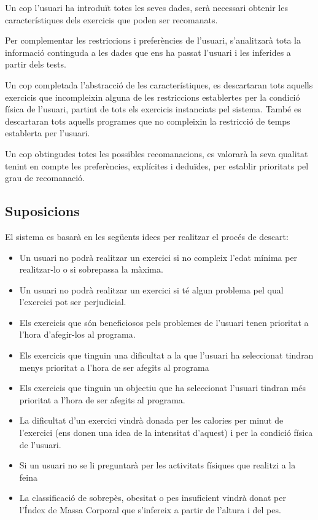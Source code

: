 \documentclass[a4paper, 12pt, UTF8]{article}
\begin{document}
Un cop l'usuari ha introduït totes les seves dades, serà necessari obtenir les característiques dels exercicis que poden ser recomanats. 

Per complementar les restriccions i preferències de l'usuari, s'analitzarà tota la informació continguda a les dades que ens ha passat l'usuari i les inferides a partir dels tests.

Un cop completada l'abstracció de les característiques, es descartaran tots aquells exercicis que incompleixin alguna de les restriccions establertes per la condició física de l'usuari, partint de tots els exercicis instanciats pel sistema. També es descartaran tots aquells programes que no compleixin la restricció de temps establerta per l'usuari.

Un cop obtingudes totes les possibles recomanacions, es valorarà la seva qualitat tenint en compte les preferències, explícites i deduïdes, per establir prioritats pel grau de recomanació.

\subsection{Suposicions}

El sistema es basarà en les següents idees per realitzar el procés de descart:

\begin{itemize}
	\item Un usuari no podrà realitzar un exercici si no compleix l'edat mínima per realitzar-lo o si sobrepassa la màxima.
	\item Un usuari no podrà realitzar un exercici si té algun problema pel qual l'exercici pot ser perjudicial.
	\item Els exercicis que són beneficiosos pels problemes de l'usuari tenen prioritat a l'hora d'afegir-los al programa.
	\item Els exercicis que tinguin una dificultat a la que l'usuari ha seleccionat tindran menys prioritat a l'hora de ser afegits al programa
	\item Els exercicis que tinguin un objectiu que ha seleccionat l'usuari tindran més prioritat a l'hora de ser afegits al programa.
	\item La dificultat d'un exercici vindrà donada per les calories per minut de l'exercici (ens donen una idea de la intensitat d'aquest) i per la condició física de l'usuari.
	\item Si un usuari no se li preguntarà per les activitats físiques que realitzi a la feina
	\item La classificació de sobrepès, obesitat o pes insuficient vindrà donat per l'Índex de Massa Corporal que s'infereix a partir de l'altura i del pes.
	
\end{itemize}
\end{document}
